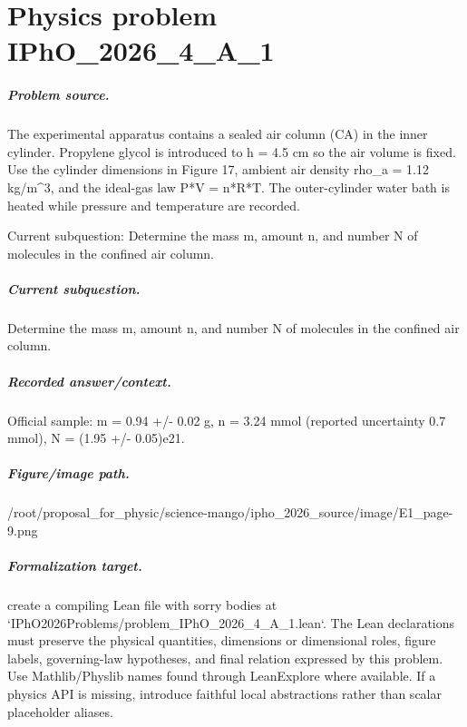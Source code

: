 
\chapter{Physics problem IPhO\_2026\_4\_A\_1}
\label{ch:IPhO2026Problems_problem_IPhO_2026_4_A_1}

\paragraph{Problem source.}
The experimental apparatus contains a sealed air column (CA) in the inner
cylinder.  Propylene glycol is introduced to h = 4.5 cm so the air volume is
fixed.  Use the cylinder dimensions in Figure 17, ambient air density
rho\_a = 1.12 kg/m\textasciicircum{}3, and the ideal-gas law P*V = n*R*T.  The outer-cylinder
water bath is heated while pressure and temperature are recorded.

Current subquestion:
Determine the mass m, amount n, and number N of molecules in the confined air column.

\paragraph{Current subquestion.}
Determine the mass m, amount n, and number N of molecules in the confined air column.

\paragraph{Recorded answer/context.}
Official sample: m = 0.94 +/- 0.02 g, n = 3.24 mmol (reported uncertainty 0.7 mmol), N = (1.95 +/- 0.05)e21.

\paragraph{Figure/image path.}
/root/proposal\_for\_physic/science-mango/ipho\_2026\_source/image/E1\_page-9.png

\paragraph{Formalization target.}
create a compiling Lean file with sorry bodies at `IPhO2026Problems/problem\_IPhO\_2026\_4\_A\_1.lean`. The Lean declarations must preserve the physical quantities, dimensions or dimensional roles, figure labels, governing-law hypotheses, and final relation expressed by this problem.
Use Mathlib/Physlib names found through LeanExplore where available. If a physics API is missing, introduce faithful local abstractions rather than scalar placeholder aliases.

